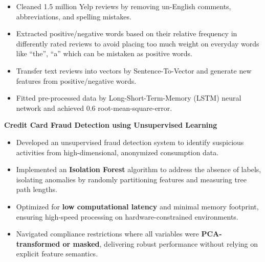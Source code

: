 \begin{cventries}
{\begin{cvitems}
\begin{itemize}
          \item Cleaned 1.5 million Yelp reviews by removing un-English comments, abbreviations, and spelling mistakes. 
          \item Extracted positive/negative words based on their relative frequency in differently rated reviews to avoid placing too much weight on everyday words like “the”, “a” which can be mistaken as positive words.
          \item	Transfer text reviews into vectors by Sentence-To-Vector and generate new features from positive/negative words.
          \item Fitted pre-processed data by Long-Short-Term-Memory (LSTM) neural network and achieved 0.6 root-mean-square-error.
        \end{itemize}
        \item \textbf{Credit Card Fraud Detection using Unsupervised Learning}
        \begin{itemize}
          \item Developed an unsupervised fraud detection system to identify suspicious activities from high-dimensional, anonymized consumption data.
          \item Implemented an \textbf{Isolation Forest} algorithm to address the absence of labels, isolating anomalies by randomly partitioning features and measuring tree path lengths.
          \item Optimized for \textbf{low computational latency} and minimal memory footprint, ensuring high-speed processing on hardware-constrained environments.
          \item Navigated compliance restrictions where all variables were \textbf{PCA-transformed or masked}, delivering robust performance without relying on explicit feature semantics.
        \end{itemize}
      \end{cvitems}
    }


\end{cventries}
